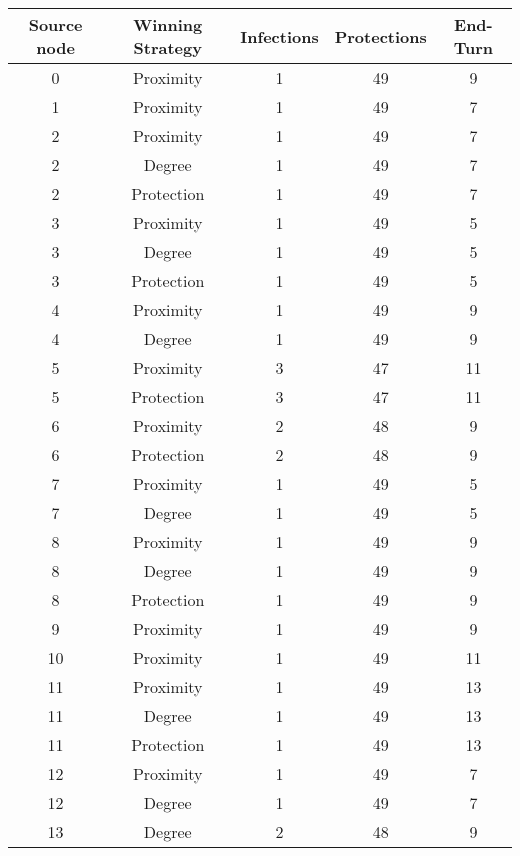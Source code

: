 \documentclass[results.tex]{subfiles}
\begin{document}
\begin{center}
  \begin{tabular}{| c || c | c | c | c |}
    \hline
    {\bfseries Source node} & {\bfseries Winning Strategy} & {\bfseries Infections} & {\bfseries Protections} & {\bfseries End-Turn} \\  %
    \hline\hline
    0 & Proximity & 1 & 49 & 9 \\ 
    \hline
    1 & Proximity & 1 & 49 & 7 \\ 
    \hline
    2 & Proximity & 1 & 49 & 7 \\ 
    \hline
    2 & Degree & 1 & 49 & 7 \\ 
    \hline
    2 & Protection & 1 & 49 & 7 \\ 
    \hline
    3 & Proximity & 1 & 49 & 5 \\ 
    \hline
    3 & Degree & 1 & 49 & 5 \\ 
    \hline
    3 & Protection & 1 & 49 & 5 \\ 
    \hline
    4 & Proximity & 1 & 49 & 9 \\ 
    \hline
    4 & Degree & 1 & 49 & 9 \\ 
    \hline
    5 & Proximity & 3 & 47 & 11 \\ 
    \hline
    5 & Protection & 3 & 47 & 11 \\ 
    \hline
    6 & Proximity & 2 & 48 & 9 \\ 
    \hline
    6 & Protection & 2 & 48 & 9 \\ 
    \hline
    7 & Proximity & 1 & 49 & 5 \\ 
    \hline
    7 & Degree & 1 & 49 & 5 \\ 
    \hline
    8 & Proximity & 1 & 49 & 9 \\ 
    \hline
    8 & Degree & 1 & 49 & 9 \\ 
    \hline
    8 & Protection & 1 & 49 & 9 \\ 
    \hline
    9 & Proximity & 1 & 49 & 9 \\ 
    \hline
    10 & Proximity & 1 & 49 & 11 \\ 
    \hline
    11 & Proximity & 1 & 49 & 13 \\ 
    \hline
    11 & Degree & 1 & 49 & 13 \\ 
    \hline
    11 & Protection & 1 & 49 & 13 \\ 
    \hline
    12 & Proximity & 1 & 49 & 7 \\ 
    \hline
    12 & Degree & 1 & 49 & 7 \\ 
    \hline
    13 & Degree & 2 & 48 & 9 \\ 

\end{tabular}
\end{center}
\end{document}

